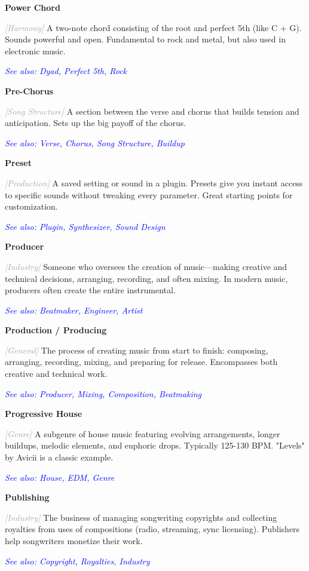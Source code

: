 \documentclass[11pt,letterpaper]{article}
\newcommand{\term}[1]{\textbf{\large\color{purple}#1}}
\newcommand{\category}[1]{\textcolor{darkgray}{\textit{\small [#1]}}}
\newcommand{\seealso}[1]{\textcolor{blue}{\textit{See also: #1}}}
\newenvironment{termdef}[1]
  {\noindent\term{#1}\par\nopagebreak}
  {\par\vspace{0.3em}}
\begin{document}
\begin{termdef}{Power Chord}
\category{Harmony}
A two-note chord consisting of the root and perfect 5th (like C + G). Sounds powerful and open. Fundamental to rock and metal, but also used in electronic music.

\seealso{Dyad, Perfect 5th, Rock}
\end{termdef}

\begin{termdef}{Pre-Chorus}
\category{Song Structure}
A section between the verse and chorus that builds tension and anticipation. Sets up the big payoff of the chorus.

\seealso{Verse, Chorus, Song Structure, Buildup}
\end{termdef}

\begin{termdef}{Preset}
\category{Production}
A saved setting or sound in a plugin. Presets give you instant access to specific sounds without tweaking every parameter. Great starting points for customization.

\seealso{Plugin, Synthesizer, Sound Design}
\end{termdef}

\begin{termdef}{Producer}
\category{Industry}
Someone who oversees the creation of music—making creative and technical decisions, arranging, recording, and often mixing. In modern music, producers often create the entire instrumental.

\seealso{Beatmaker, Engineer, Artist}
\end{termdef}

\begin{termdef}{Production / Producing}
\category{General}
The process of creating music from start to finish: composing, arranging, recording, mixing, and preparing for release. Encompasses both creative and technical work.

\seealso{Producer, Mixing, Composition, Beatmaking}
\end{termdef}

\begin{termdef}{Progressive House}
\category{Genre}
A subgenre of house music featuring evolving arrangements, longer buildups, melodic elements, and euphoric drops. Typically 125-130 BPM. "Levels" by Avicii is a classic example.

\seealso{House, EDM, Genre}
\end{termdef}

\begin{termdef}{Publishing}
\category{Industry}
The business of managing songwriting copyrights and collecting royalties from uses of compositions (radio, streaming, sync licensing). Publishers help songwriters monetize their work.

\seealso{Copyright, Royalties, Industry}
\end{termdef}
\end{document}
